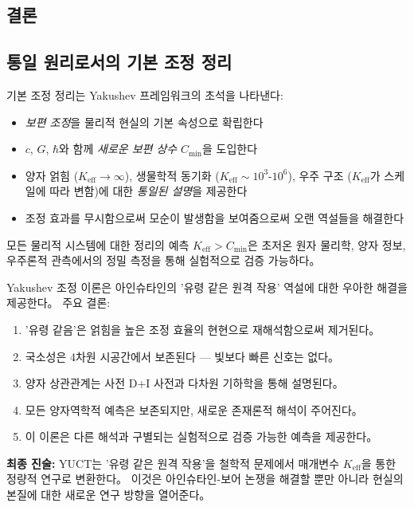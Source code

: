 \documentclass[11pt,a4paper]{article}
\begin{document}
\subsection{결론}
\label{subsec:epr-conclusion}
\subsection{통일 원리로서의 기본 조정 정리}

기본 조정 정리는 Yakushev 프레임워크의 초석을 나타낸다:
\begin{itemize}
\item \emph{보편 조정}을 물리적 현실의 기본 속성으로 확립한다
\item $c$, $G$, $\hbar$와 함께 \emph{새로운 보편 상수} $C_{\min}$을 도입한다
\item 양자 얽힘 ($K_{\mathrm{eff}} \to \infty$), 생물학적 동기화 ($K_{\mathrm{eff}} \sim 10^3$-$10^6$), 우주 구조 ($K_{\mathrm{eff}}$가 스케일에 따라 변함)에 대한 \emph{통일된 설명}을 제공한다
\item 조정 효과를 무시함으로써 모순이 발생함을 보여줌으로써 오랜 역설들을 해결한다
\end{itemize}

모든 물리적 시스템에 대한 정리의 예측 $K_{\mathrm{eff}} > C_{\min}$은 초저온 원자 물리학, 양자 정보, 우주론적 관측에서의 정밀 측정을 통해 실험적으로 검증 가능하다。

Yakushev 조정 이론은 아인슈타인의 '유령 같은 원격 작용' 역설에 대한 우아한 해결을 제공한다。 주요 결론:

\begin{enumerate}
\item '유령 같음'은 얽힘을 높은 조정 효율의 현현으로 재해석함으로써 제거된다。

\item 국소성은 4차원 시공간에서 보존된다 — 빛보다 빠른 신호는 없다。

\item 양자 상관관계는 사전 D+I 사전과 다차원 기하학을 통해 설명된다。

\item 모든 양자역학적 예측은 보존되지만, 새로운 존재론적 해석이 주어진다。

\item 이 이론은 다른 해석과 구별되는 실험적으로 검증 가능한 예측을 제공한다。
\end{enumerate}

\textbf{최종 진술:} YUCT는 '유령 같은 원격 작용'을 철학적 문제에서 매개변수 $K_{\mathrm{eff}}$을 통한 정량적 연구로 변환한다。 이것은 아인슈타인-보어 논쟁을 해결할 뿐만 아니라 현실의 본질에 대한 새로운 연구 방향을 열어준다。
\end{document}
